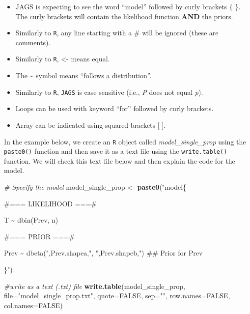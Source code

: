 \documentclass[
]{book}
\newenvironment{Shaded}{\begin{snugshade}}{\end{snugshade}}
\newcommand{\AttributeTok}[1]{\textcolor[rgb]{0.13,0.29,0.53}{#1}}
\newcommand{\CommentTok}[1]{\textcolor[rgb]{0.56,0.35,0.01}{\textit{#1}}}
\newcommand{\ConstantTok}[1]{\textcolor[rgb]{0.56,0.35,0.01}{#1}}
\newcommand{\FunctionTok}[1]{\textcolor[rgb]{0.13,0.29,0.53}{\textbf{#1}}}
\newcommand{\NormalTok}[1]{#1}
\newcommand{\OtherTok}[1]{\textcolor[rgb]{0.56,0.35,0.01}{#1}}
\newcommand{\StringTok}[1]{\textcolor[rgb]{0.31,0.60,0.02}{#1}}
\begin{document}
\begin{itemize}
\item
  JAGS is expecting to see the word ``model'' followed by curly brackets \{ \}. The curly brackets will contain the likelihood function \textbf{AND} the priors.
\item
  Similarly to \texttt{R}, any line starting with a \# will be ignored (these are comments).
\item
  Similarly to \texttt{R}, \textless- means equal.
\item
  The \textasciitilde{} symbol means ``follows a distribution''.
\item
  Similarly to \texttt{R}, \texttt{JAGS} is case sensitive (i.e., \emph{P} does not equal \emph{p}).
\item
  Loops can be used with keyword ``for'' followed by curly brackets.
\item
  Array can be indicated using squared brackets {[} {]}.
\end{itemize}

In the example below, we create an \texttt{R} object called \emph{model\_single\_prop} using the \texttt{paste0()} function and then save it as a text file using the \texttt{write.table()} function. We will check this text file below and then explain the code for the model.

\begin{Shaded}
\begin{Highlighting}[]
\CommentTok{\# Specify the model}
\NormalTok{model\_single\_prop }\OtherTok{\textless{}{-}} \FunctionTok{paste0}\NormalTok{(}\StringTok{"model\{}

\StringTok{\#=== LIKELIHOOD ===\#}

\StringTok{  T \textasciitilde{} dbin(Prev, n)}


\StringTok{\#=== PRIOR  ===\#}

\StringTok{  Prev \textasciitilde{} dbeta("}\NormalTok{,Prev.shapea,}\StringTok{", "}\NormalTok{,Prev.shapeb,}\StringTok{")    \#\# Prior for Prev}

\StringTok{\}"}\NormalTok{)}

\CommentTok{\#write as a text (.txt) file}
\FunctionTok{write.table}\NormalTok{(model\_single\_prop, }
            \AttributeTok{file=}\StringTok{"model\_single\_prop.txt"}\NormalTok{, }
            \AttributeTok{quote=}\ConstantTok{FALSE}\NormalTok{, }
            \AttributeTok{sep=}\StringTok{""}\NormalTok{, }
            \AttributeTok{row.names=}\ConstantTok{FALSE}\NormalTok{,}
            \AttributeTok{col.names=}\ConstantTok{FALSE}\NormalTok{)}
\end{Highlighting}
\end{Shaded}
\end{document}
